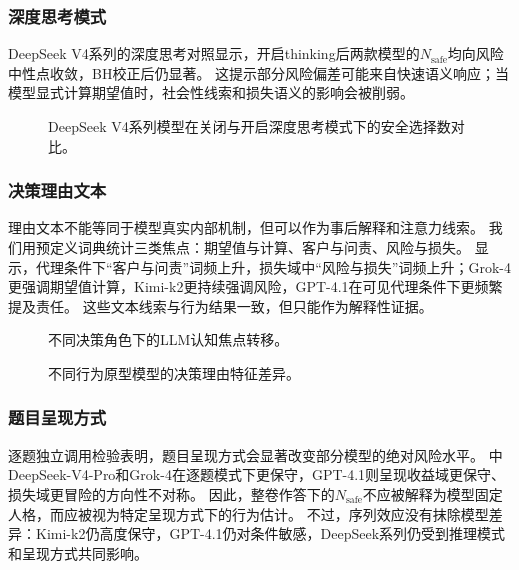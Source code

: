 \subsubsection{深度思考模式}

DeepSeek V4系列的深度思考对照显示，开启thinking后两款模型的$N_{\text{safe}}$均向风险中性点收敛，BH校正后仍显著。
这提示部分风险偏差可能来自快速语义响应；当模型显式计算期望值时，社会性线索和损失语义的影响会被削弱。



\begin{figure}[!htbp]
  \centering
  
  \caption{DeepSeek V4系列模型在关闭与开启深度思考模式下的安全选择数对比。}
  \label{fig:deepseek_thinking}
\end{figure}

\subsubsection{决策理由文本}

理由文本不能等同于模型真实内部机制，但可以作为事后解释和注意力线索。
我们用预定义词典统计三类焦点：期望值与计算、客户与问责、风险与损失。
显示，代理条件下“客户与问责”词频上升，损失域中“风险与损失”词频上升；Grok-4更强调期望值计算，Kimi-k2更持续强调风险，GPT-4.1在可见代理条件下更频繁提及责任。
这些文本线索与行为结果一致，但只能作为解释性证据。

\begin{figure}[!htbp]
  \centering
  
  \caption{不同决策角色下的LLM认知焦点转移。}
  \label{fig:text_analysis}
\end{figure}

\begin{figure}[!htbp]
  \centering
  
  \caption{不同行为原型模型的决策理由特征差异。}
  \label{fig:text_models}
\end{figure}

\subsubsection{题目呈现方式}

逐题独立调用检验表明，题目呈现方式会显著改变部分模型的绝对风险水平。
中DeepSeek-V4-Pro和Grok-4在逐题模式下更保守，GPT-4.1则呈现收益域更保守、损失域更冒险的方向性不对称。
因此，整卷作答下的$N_{\text{safe}}$不应被解释为模型固定人格，而应被视为特定呈现方式下的行为估计。
不过，序列效应没有抹除模型差异：Kimi-k2仍高度保守，GPT-4.1仍对条件敏感，DeepSeek系列仍受到推理模式和呈现方式共同影响。

